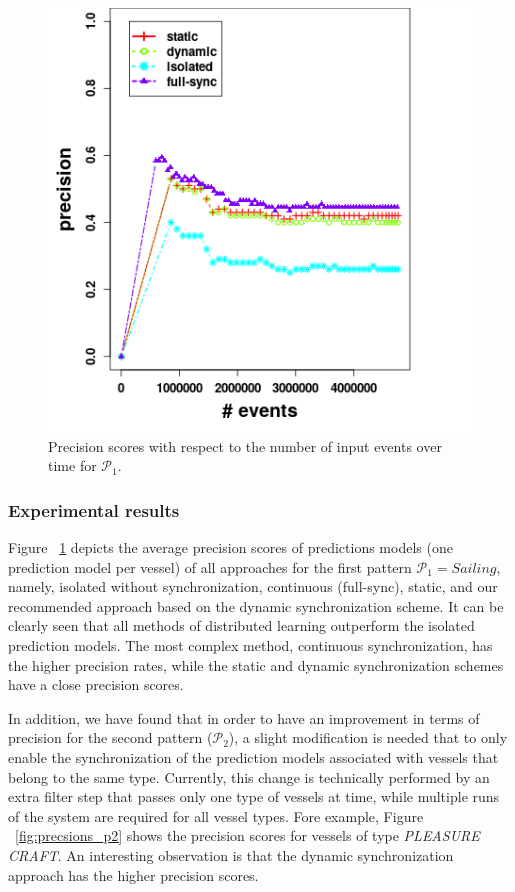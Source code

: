 \begin{figure}[h]
	
	\includegraphics[width=.5\textwidth,height=.3\textheight]{figures/precision.png}
	
	\caption{Precision scores with respect to the number of input events over time for $\mathcal{P}_1$.}
	\label{fig:precsions}
\end{figure}

\subsubsection*{Experimental results} Figure ~\ref{fig:precsions} depicts the average precision scores of predictions models (one prediction model per vessel) of all approaches for the first pattern $\mathcal{P}_1=Sailing$, namely, isolated without synchronization, continuous (full-sync), static, and our recommended approach based on the dynamic synchronization scheme. It can be clearly seen that all methods of distributed learning outperform the isolated prediction models. The most complex method, continuous synchronization, has the higher precision rates, while the static and dynamic synchronization schemes have a close precision scores.

In addition, we have found that in order to have an improvement in terms of precision for the second pattern ($\mathcal{P}_2$), a slight modification is needed that to only enable the synchronization of the prediction models associated with vessels that belong to the same type. Currently, this change is technically performed by an extra filter step that passes only one type of vessels at time, while multiple runs of the system are required for all vessel types. Fore example, Figure ~\ref{fig:precsions_p2} shows the precision scores for vessels of type \textit{PLEASURE CRAFT}. An interesting observation is that the dynamic synchronization approach has the higher precision scores.  

